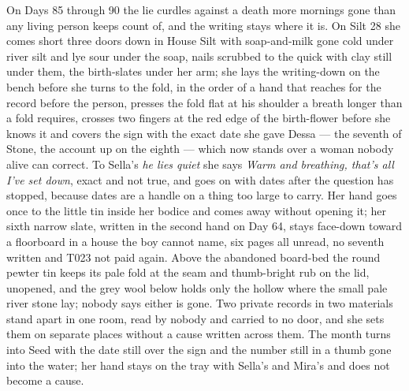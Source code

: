 \documentclass{design/chronicle}
\begin{document}
{On Days 85 through 90 the lie curdles against a death more mornings gone than any living person keeps count of, and the writing stays where it is. On Silt 28 she comes short three doors down in House Silt with soap-and-milk gone cold under river silt and lye sour under the soap, nails scrubbed to the quick with clay still under them, the birth-slates under her arm; she lays the writing-down on the bench before she turns to the fold, in the order of a hand that reaches for the record before the person, presses the fold flat at his shoulder a breath longer than a fold requires, crosses two fingers at the red edge of the birth-flower before she knows it and covers the sign with the exact date she gave Dessa --- the seventh of Stone, the account up on the eighth --- which now stands over a woman nobody alive can correct. To Sella’s \emph{he lies quiet} she says \emph{Warm and breathing, that’s all I’ve set down}, exact and not true, and goes on with dates after the question has stopped, because dates are a handle on a thing too large to carry. Her hand goes once to the little tin inside her bodice and comes away without opening it; her sixth narrow slate, written in the second hand on Day 64, stays face-down toward a floorboard in a house the boy cannot name, six pages all unread, no seventh written and T023 not paid again. Above the abandoned board-bed the round pewter tin keeps its pale fold at the seam and thumb-bright rub on the lid, unopened, and the grey wool below holds only the hollow where the small pale river stone lay; nobody says either is gone. Two private records in two materials stand apart in one room, read by nobody and carried to no door, and she sets them on separate places without a cause written across them. The month turns into Seed with the date still over the sign and the number still in a thumb gone into the water; her hand stays on the tray with Sella’s and Mira’s and does not become a cause.

}
\end{document}

